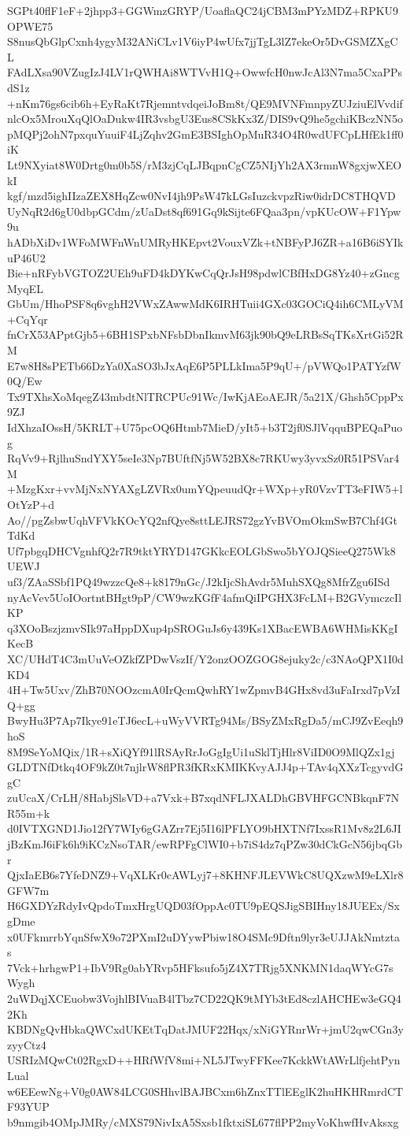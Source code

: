 SGPt40flF1eF+2jhpp3+GGWmzGRYP/UoaflaQC24jCBM3mPYzMDZ+RPKU9OPWE75
S8nusQbGlpCxnh4ygyM32ANiCLv1V6iyP4wUfx7jjTgL3lZ7ekeOr5DvGSMZXgCL
FAdLXsa90VZugIzJ4LV1rQWHAi8WTVvH1Q+OwwfcH0nwJcAl3N7ma5CxaPPsdS1z
+nKm76gs6cib6h+EyRaKt7RjemntvdqeiJoBm8t/QE9MVNFmnpyZUJziuElVvdif
nlcOx5MrouXqQlOaDukw4IR3vsbgU3Eus8CSkKx3Z/DIS9vQ9he5gchiKBczNN5o
pMQPj2ohN7pxquYuuiF4LjZqhv2GmE3BSIghOpMuR34O4R0wdUFCpLHfEk1ff0iK
Lt9NXyiat8W0Drtg0m0b5S/rM3zjCqLJBqpnCgCZ5NIjYh2AX3rmnW8gxjwXEOkI
kgf/mzd5ighIIzaZEX8HqZcw0NvI4jh9PsW47kLGsIuzckvpzRiw0idrDC8THQVD
UyNqR2d6gU0dbpGCdm/zUaDst8qf691Gq9kSijte6FQaa3pn/vpKUcOW+F1Ypw9u
hADbXiDv1WFoMWFnWnUMRyHKEpvt2VouxVZk+tNBFyPJ6ZR+a16B6iSYIkuP46U2
Bie+nRFybVGTOZ2UEh9uFD4kDYKwCqQrJsH98pdwlCBfHxDG8Yz40+zGncgMyqEL
GbUm/HhoPSF8q6vghH2VWxZAwwMdK6IRHTuii4GXc03GOCiQ4ih6CMLyVM+CqYqr
fnCrX53APptGjb5+6BH1SPxbNFsbDbnIkmvM63jk90bQ9eLRBsSqTKsXrtGi52RM
E7w8H8sPETb66DzYa0XaSO3bJxAqE6P5PLLkIma5P9qU+/pVWQo1PATYzfW0Q/Ew
Tx9TXhsXoMqegZ43mbdtNlTRCPUc91Wc/IwKjAEoAEJR/5a21X/Ghsh5CppPx9ZJ
IdXhzaIOssH/5KRLT+U75pcOQ6Htmb7MieD/yIt5+b3T2jf0SJlVqquBPEQaPuog
RqVv9+RjlhuSndYXY5seIe3Np7BUftfNj5W52BX8c7RKUwy3yvxSz0R51PSVar4M
+MzgKxr+vvMjNxNYAXgLZVRx0umYQpeuudQr+WXp+yR0VzvTT3eFIW5+lOtYzP+d
Ao//pgZsbwUqhVFVkKOcYQ2nfQye8sttLEJRS72gzYvBVOmOkmSwB7Chf4GtTdKd
Uf7pbgqDHCVgnhfQ2r7R9tktYRYD147GKkcEOLGbSwo5bYOJQSieeQ275Wk8UEWJ
uf3/ZAaSSbf1PQ49wzzcQe8+k8179nGc/J2kIjcShAvdr5MuhSXQg8MfrZgu6ISd
nyAcVev5UoIOortntBHgt9pP/CW9wzKGfF4afmQiIPGHX3FcLM+B2GVymczcIlKP
q3XOoBszjzmvSIk97aHppDXup4pSROGuJs6y439Ks1XBacEWBA6WHMisKKgIKecB
XC/UHdT4C3mUuVeOZkfZPDwVszIf/Y2onzOOZGOG8ejuky2c/c3NAoQPX1I0dKD4
4H+Tw5Uxv/ZhB70NOOzcmA0IrQcmQwhRY1wZpmvB4GHx8vd3uFaIrxd7pVzIQ+gg
BwyHu3P7Ap7Ikye91eTJ6ecL+uWyVVRTg94Ms/BSyZMxRgDa5/mCJ9ZvEeqh9hoS
8M9SeYoMQix/1R+sXiQYf91lRSAyRrJoGgIgUi1uSklTjHlr8ViID0O9MlQZx1gj
GLDTNfDtkq4OF9kZ0t7njlrW8flPR3fKRxKMIKKvyAJJ4p+TAv4qXXzTcgyvdGgC
zuUcaX/CrLH/8HabjSlsVD+a7Vxk+B7xqdNFLJXALDhGBVHFGCNBkqnF7NR55m+k
d0IVTXGND1Jio12fY7WIy6gGAZrr7Ej5I16lPFLYO9bHXTNf7IxssR1Mv8z2L6JI
jBzKmJ6iFk6h9iKCzNsoTAR/ewRPFgClWI0+b7iS4dz7qPZw30dCkGcN56jbqGbr
QjxIaEB6s7YfeDNZ9+VqXLKr0cAWLyj7+8KHNFJLEVWkC8UQXzwM9eLXlr8GFW7m
H6GXDYzRdyIvQpdoTmxHrgUQD03fOppAc0TU9pEQSJigSBIHny18JUEEx/SxgDme
x0UFkmrrbYqnSfwX9o72PXmI2uDYywPbiw18O4SMc9Dftn9lyr3eUJJAkNmtztas
7Vck+hrhgwP1+IbV9Rg0abYRvp5HFksufo5jZ4X7TRjg5XNKMN1daqWYcG7sWygh
2uWDqjXCEuobw3VojhlBIVuaB4lTbz7CD22QK9tMYb3tEd8czlAHCHEw3eGQ42Kh
KBDNgQvHbkaQWCxdUKEtTqDatJMUF22Hqx/xNiGYRnrWr+jmU2qwCGn3yzyyCtz4
USRIzMQwCt02RgxD++HRfWfV8mi+NL5JTwyFFKee7KckkWtAWrLlfjehtPynLual
w6EEewNg+V0g0AW84LCG0SHhvlBAJBCxm6hZnxTTlEEglK2huHKHRmrdCTF93YUP
b9nmgib4OMpJMRy/cMXS79NivIxA5Sxsb1fktxiSL677flPP2myVoKhwfHvAksxg
